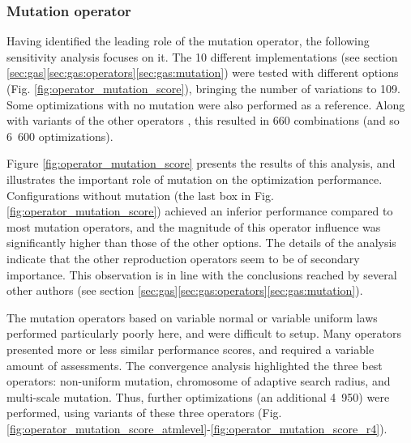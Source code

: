 \documentclass{ametsoc}
\begin{document}
\subsubsection{Mutation operator}
\label{sec:assessment:mutation}

Having identified the leading role of the mutation operator, the following sensitivity analysis focuses on it. The 10 different implementations (see section \ref{sec:gas}\ref{sec:gas:operators}\ref{sec:gas:mutation}) were tested with different options (Fig. \ref{fig:operator_mutation_score}), bringing the number of variations to 109. Some optimizations with no mutation were also performed as a reference. Along with variants of the other operators \citep[see][for details]{Horton2012a}, this resulted in 660 combinations (and so 6~600 optimizations).

Figure \ref{fig:operator_mutation_score} presents the results of this analysis, and illustrates the important role of mutation on the optimization performance. Configurations without mutation (the last box in Fig. \ref{fig:operator_mutation_score}) achieved an inferior performance compared to most mutation operators, and the magnitude of this operator influence was significantly higher than those of the other options. The details of the analysis \citep[see][]{Horton2012a} indicate that the other reproduction operators seem to be of secondary importance. This observation is in line with the conclusions reached by several other authors (see section \ref{sec:gas}\ref{sec:gas:operators}\ref{sec:gas:mutation}).

The mutation operators based on variable normal or variable uniform laws performed particularly poorly here, and were difficult to setup. Many operators presented more or less similar performance scores, and required a variable amount of assessments. The convergence analysis \citep[see][]{Horton2012a} highlighted the three best operators: non-uniform mutation, chromosome of adaptive search radius, and multi-scale mutation. Thus, further optimizations (an additional 4~950) were performed, using variants of these three operators (Fig. \ref{fig:operator_mutation_score_atmlevel}-\ref{fig:operator_mutation_score_r4}).
\end{document}
